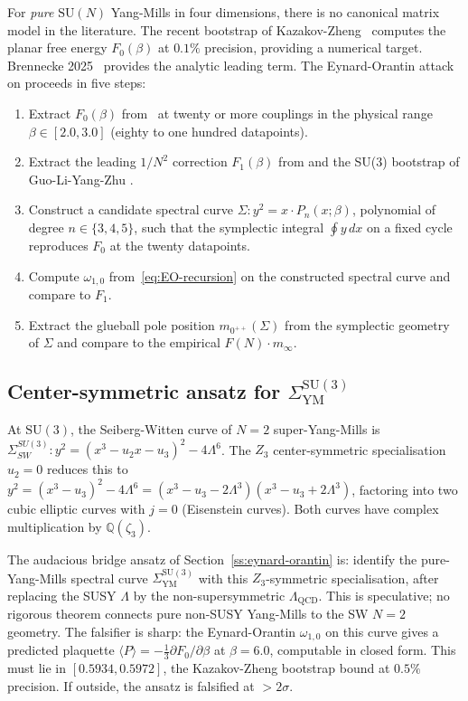 \documentclass[11pt]{amsart}
\theoremstyle{definition}
\theoremstyle{remark}
\newcommand{\Q}{\mathbb{Q}}
\begin{document}
For \emph{pure} $\mathrm{SU}(N)$ Yang-Mills in four dimensions, there
is no canonical matrix model in the literature. The recent bootstrap
of Kazakov-Zheng~\cite{KazakovZheng2024} computes the planar free
energy $F_0(\beta)$ at $0.1\%$ precision, providing a numerical
target. Brennecke 2025~\cite{Brennecke2025} provides the analytic
leading term. The Eynard-Orantin attack on
 proceeds in five steps:

\begin{enumerate}
\item Extract $F_0(\beta)$ from~\cite{KazakovZheng2024} at twenty or
more couplings in the physical range $\beta \in [2.0, 3.0]$ (eighty
to one hundred datapoints).
\item Extract the leading $1/N^2$ correction $F_1(\beta)$ from
\cite{Brennecke2025} and the SU(3) bootstrap of Guo-Li-Yang-Zhu
\cite{GuoLiYangZhu2025}.
\item Construct a candidate spectral curve $\Sigma : y^2 = x \cdot
P_n(x; \beta)$, polynomial of degree $n \in \{3, 4, 5\}$, such that
the symplectic integral $\oint y\, dx$ on a fixed cycle reproduces
$F_0$ at the twenty datapoints.
\item Compute $\omega_{1, 0}$ from~\eqref{eq:EO-recursion} on the
constructed spectral curve and compare to $F_1$.
\item Extract the glueball pole position $m_{0^{++}}(\Sigma)$ from
the symplectic geometry of $\Sigma$ and compare to the empirical
$F(N) \cdot m_\infty$.
\end{enumerate}

\subsection{Center-symmetric ansatz for $\Sigma_{\mathrm{YM}}^{\mathrm{SU}(3)}$}
\label{ss:Z3-ansatz}
At $\mathrm{SU}(3)$, the Seiberg-Witten curve of $N=2$ super-Yang-Mills
\cite{KlemmLerche1994} is
$\Sigma_{SW}^{SU(3)} : y^2 = (x^3 - u_2 x - u_3)^2 - 4 \Lambda^6$.
The $Z_3$ center-symmetric specialisation $u_2 = 0$ reduces this to
$y^2 = (x^3 - u_3)^2 - 4 \Lambda^6 = (x^3 - u_3 - 2\Lambda^3)(x^3 -
u_3 + 2\Lambda^3)$, factoring into two cubic elliptic curves with
$j = 0$ (Eisenstein curves). Both curves have complex multiplication
by $\Q(\zeta_3)$.

The audacious bridge ansatz of Section~\ref{ss:eynard-orantin} is:
identify the pure-Yang-Mills spectral curve
$\Sigma_{\mathrm{YM}}^{\mathrm{SU}(3)}$ with this $Z_3$-symmetric
specialisation, after replacing the SUSY $\Lambda$ by the
non-supersymmetric $\Lambda_{\mathrm{QCD}}$. This is speculative; no
rigorous theorem connects pure non-SUSY Yang-Mills to the SW
$N=2$ geometry. The falsifier is sharp: the Eynard-Orantin
$\omega_{1, 0}$ on this curve gives a predicted plaquette
$\langle P \rangle = -\frac{1}{3} \partial F_0 / \partial \beta$ at
$\beta = 6.0$, computable in closed form. This must lie in
$[0.5934, 0.5972]$, the Kazakov-Zheng bootstrap bound at $0.5\%$
precision. If outside, the ansatz is falsified at $> 2\sigma$.
\end{document}
